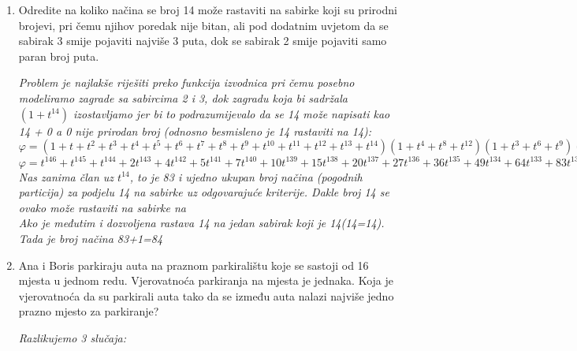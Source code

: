 \documentclass[12pt]{article}
\begin{document}
\begin{enumerate}
\begin{center}
{		}
	    \end{center}
		\item Odredite na koliko načina se broj 14 može rastaviti na sabirke koji su prirodni brojevi, pri čemu njihov poredak nije bitan, ali pod dodatnim uvjetom da se sabirak 3 smije pojaviti najviše 3 puta, dok se sabirak 2 smije pojaviti samo paran broj puta.
		\begin{center}
		\textit{Problem je najlakše riješiti preko funkcija izvodnica pri čemu posebno modeliramo zagrade sa sabircima 2 i 3, dok zagradu koja bi sadržala $(1+t^{14})$ izostavljamo jer bi to podrazumijevalo da se 14 može napisati kao 14 + 0 a 0 nije prirodan broj (odnosno besmisleno je 14 rastaviti na 14):\\
		$\varphi = (1 + t + t^2 + t^3 + t^4 + t^5 + t^6 + t^7 + t^8 + t^9 + t^{{10}} + t^{11} + t^{12} + t^{13} + t^{14})(1 + t^4 + t^8 + t^{12})(1 + t^3 + t^6 + t^9)(1 + t^4 + t^8 + t^{12})(1 + t^5 + t^{10})(1 + t^6 + t^{12})(1 + t^7 + t^{14})(1 + t^8)(1 + t^9)(1 + t^{10})(1 + t^{11})(1 + t^{12})(1 + t^{13})$\\
		\vspace{0.15cm}
		$\varphi = t^{146} + t^{145} + t^{144} + 2 t^{143} + 4 t^{142} + 5 t^{141} + 7 t^{140} + 10 t^{139} + 15 t^{138} + 20 t^{137} + 27 t^{136} + 36 t^{135} + 49 t^{134} + 64 t^{133} + 83 t^{132} + 105 t^{131} + 134 t^{130} + ... + 105 t^{15} + 83 t^{14} + 64 t^{13} + 49 t^{12} + 36 t^{11} + 27 t^{10} + 20 t^9 + 15 t^8 + 10 t^7 + 7 t^6 + 5 t^5 + 4 t^4 + 2 t^3 + t^2 + t + 1$\\
		\vspace{0.15cm}
		Nas zanima član uz $t^{14}$, to je 83 i ujedno ukupan broj načina (pogodnih particija) za podjelu 14 na sabirke uz odgovarajuće kriterije. Dakle broj 14 se ovako može rastaviti na sabirke na \\
		Ako je međutim i dozvoljena rastava 14 na jedan sabirak koji je 14(14=14). Tada je broj načina 83+1=84}
	    \end{center}
	    \vspace{0.75cm}
		\item Ana i Boris parkiraju auta na praznom parkiralištu koje se sastoji od 16 mjesta u jednom redu. Vjerovatnoća parkiranja na mjesta je jednaka. Koja je vjerovatnoća da su parkirali auta tako da se između auta nalazi najviše jedno prazno mjesto za parkiranje?
		\begin{center}
		\vspace{0.30cm}
		\textit{Razlikujemo 3 slučaja:\\ \vspace{0.15cm}
}
\end{center}
\end{enumerate}
\end{document}
